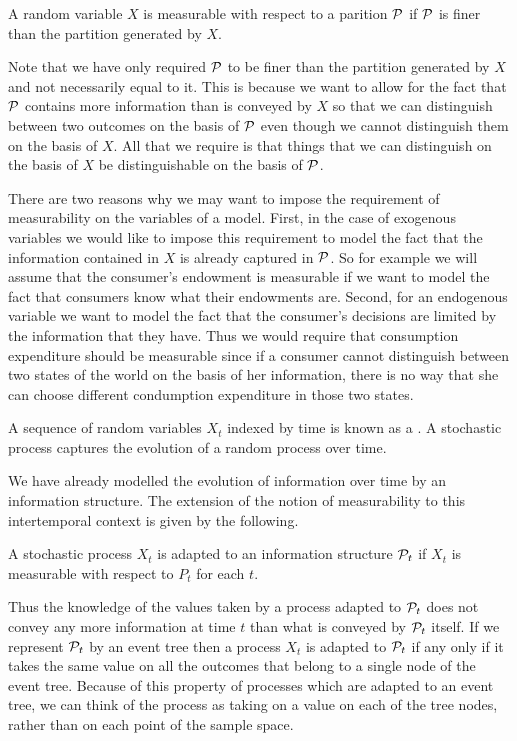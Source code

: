 \documentclass[11pt,reqno,openany]{amsbook}
\begin{document}
\begin{defn}[Measurability]
  A random variable $X$ is measurable with respect to a
  parition $\mathcal{P}$ if $\mathcal{P}$ is finer than the
  partition generated by $X$.
\end{defn}

Note that we have only required $\mathcal{P}$ to be finer
than the partition generated by $X$ and not necessarily
equal to it. This is because we want to allow for the fact
that $\mathcal{P}$ contains more information than is conveyed
by $X$ so that we can distinguish between two outcomes on
the basis of $\mathcal{P}$ even though we cannot distinguish
them on the basis of $X$. All that we require is that things
that we can distinguish on the basis of $X$ be
distinguishable on the basis of $\mathcal{P}$.
 
There are two reasons why we may want to impose the
requirement of measurability on the variables of a
model. First, in the case of exogenous variables we would
like to impose this requirement to model the fact that the
information contained in $X$ is already captured in
$\mathcal{P}$. So for example we will assume that the
consumer's endowment is measurable if we want to model the
fact that consumers know what their endowments are. Second,
for an endogenous variable we want to model the fact that
the consumer's decisions are limited by the information that
they have. Thus we would require that consumption expenditure
should be measurable since if a consumer cannot distinguish
between two states of the world on the basis of her
information, there is no way that she can choose different
condumption expenditure in those two states.

A sequence of random variables $X_t$ indexed by time is
known as a . A stochastic
process captures the evolution of a random process over
time.

We have already modelled the evolution of information over
time by an information structure. The extension of the
notion of measurability to this intertemporal context is
given by the following.

\begin{defn}
  A stochastic process $X_t$ is adapted to an information
  structure $\mathcal{P}_t$ if $X_t$ is measurable with
  respect to $P_t$ for each $t$. 
\end{defn}

Thus the knowledge of the values taken by a process adapted
to $\mathcal{P}_t$ does not convey any more information at
time $t$ than what is conveyed by $\mathcal{P}_t$ itself. If
we represent $\mathcal{P}_t$ by an event tree then a process
$X_t$ is adapted to $\mathcal{P}_t$ if any only if it takes
the same value on all the outcomes that belong to a single
node of the event tree. Because of this property of
processes which are adapted to an event tree, we can think
of the process as taking on a value on each of the tree
nodes, rather than on each point of the sample space.
\end{document}
